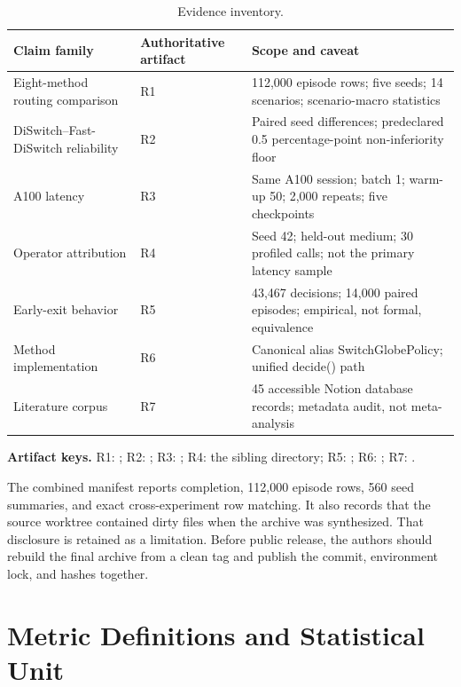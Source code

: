 \documentclass{ieeeaccess}
\begin{document}
\begin{table}[t]
\caption{Evidence inventory.}\label{tab:inventory}\small
\begin{tabularx}{\textwidth}{p{}p{}X}
\toprule
Claim family & Authoritative artifact & Scope and caveat \\
\midrule
Eight-method routing comparison & R1 & 112,000 episode rows; five seeds; 14 scenarios; scenario-macro statistics \\
DiSwitch--Fast-DiSwitch reliability & R2 & Paired seed differences; predeclared 0.5 percentage-point non-inferiority floor \\
A100 latency & R3 & Same A100 session; batch 1; warm-up 50; 2,000 repeats; five checkpoints \\
Operator attribution & R4 & Seed 42; held-out medium; 30 profiled calls; not the primary latency sample \\
Early-exit behavior & R5 & 43,467 decisions; 14,000 paired episodes; empirical, not formal, equivalence \\
Method implementation & R6 & Canonical alias SwitchGlobePolicy; unified decide() path \\
Literature corpus & R7 & 45 accessible Notion database records; metadata audit, not meta-analysis \\
\bottomrule
\end{tabularx}
\end{table}

\noindent\textbf{Artifact keys.} R1: ; R2: ; R3: ; R4: the sibling  directory; R5: ; R6: ; R7: .

The combined manifest reports completion, 112,000 episode rows, 560 seed summaries, and exact cross-experiment row matching. It also records that the source worktree contained dirty files when the archive was synthesized. That disclosure is retained as a limitation. Before public release, the authors should rebuild the final archive from a clean tag and publish the commit, environment lock, and hashes together.

\section{Metric Definitions and Statistical Unit}
\end{document}
